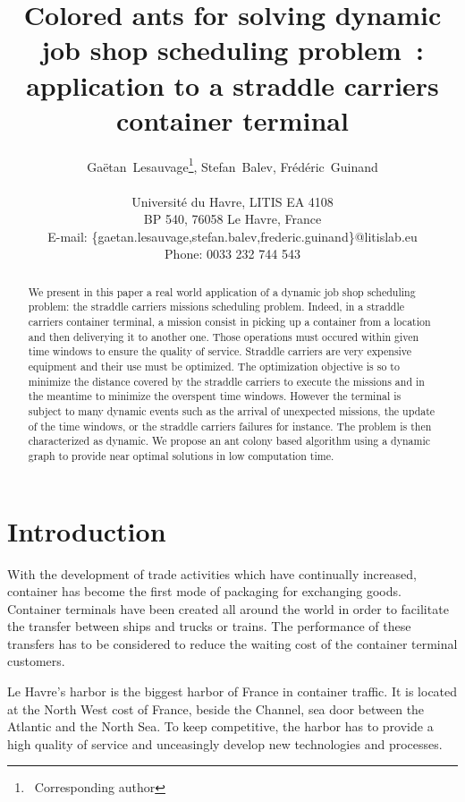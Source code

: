 \documentclass[a4paper,10pt]{article}
\title{Colored ants for solving dynamic job shop scheduling problem : application to a straddle carriers container terminal
}
\author{Ga\"{e}tan~Lesauvage\thanks{~Corresponding author}, Stefan~Balev, Fr\'{e}d\'{e}ric~Guinand\\\\
\medskip
Universit\'{e} du Havre, LITIS EA 4108\\
BP 540, 76058 Le Havre, France\\
\medskip
E-mail: \{gaetan.lesauvage,stefan.balev,frederic.guinand\}@litislab.eu\\
\medskip
Phone: 0033 232 744 543
}
\begin{document}
\maketitle

\begin{abstract}
We present in this paper a real world application of a dynamic job shop scheduling problem: the straddle carriers missions scheduling problem. Indeed, in a straddle carriers container terminal, a mission consist in picking up a container from a location and then deliverying it to another one. Those operations must occured within given time windows to ensure the quality of service. Straddle carriers are very expensive equipment and their use must be optimized. The optimization objective is so to minimize the distance covered by the straddle carriers to execute the missions and in the meantime to minimize the overspent time windows.
However the terminal is subject to many dynamic events such as the arrival of unexpected missions, the update of the time windows, or the straddle carriers failures for instance. The problem is then characterized as dynamic.
We propose an ant colony based algorithm using a dynamic graph to provide near optimal solutions in low computation time.

\end{abstract}

\section{Introduction}

With the development of trade activities which have continually increased, container has become the first mode of packaging for exchanging goods. Container terminals have been created all around the world in order to facilitate the transfer between ships and trucks or trains. The performance of these transfers has to be considered to reduce the waiting cost of the container terminal customers.

Le Havre’s harbor is the biggest harbor of France in container traffic. It is located at the North West cost of France, beside the Channel, sea door between the Atlantic and the North Sea. To keep competitive, the harbor has to provide a high quality of service and unceasingly develop new technologies and processes.
\end{document}
